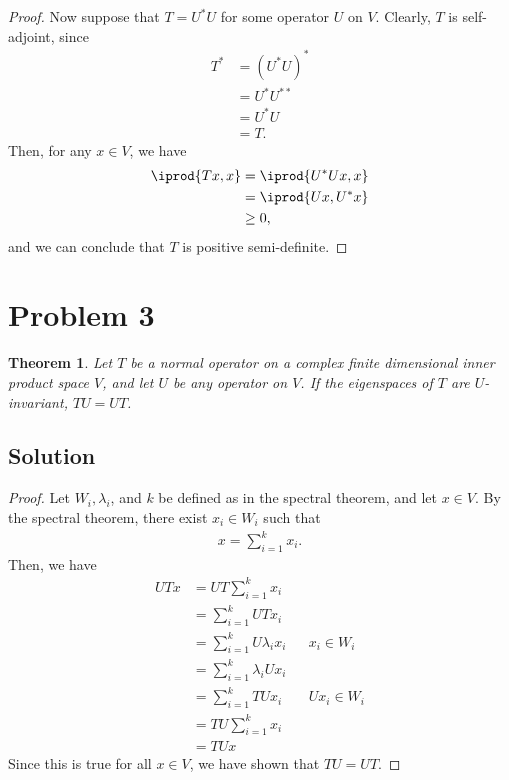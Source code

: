 \documentclass[10pt,a4paper]{article}
\newtheorem{theorem}{Theorem}
\theoremstyle{definition}
\begin{document}
\begin{proof}
Now suppose that $T = U^* U$ for some operator $U$ on $V$. Clearly, $T$ is self-adjoint, since
\begin{align*}
T^* &= (U^* U)^*\\
&= U^* U^{**}\\
&= U^* U\\
&= T.
\end{align*} 
Then, for any $x \in V$, we have
\begin{align*}
\iprod{Tx, x} &= \iprod{U^*U x, x}\\
&= \iprod{U x, U^* x}\\
&\geq 0,
\end{align*}
and we can conclude that $T$ is positive semi-definite.
\end{proof}

\section*{Problem 3}
\begin{theorem}
Let $T$ be a normal operator on a complex finite dimensional inner product space $V$, and let $U$ be any operator on $V$. If the
eigenspaces of $T$ are $U$-invariant, $TU = UT$.
\end{theorem}

\subsection*{Solution}
\begin{proof}
Let $W_i, \lambda_i$, and $k$ be defined as in the spectral theorem, and let $x \in V$. By the spectral theorem, there exist $x_i \in W_i$ such that
\begin{align*}
x = \sum_{i=1}^k x_i.
\end{align*}
Then, we have 
\begin{align*}
UTx &= UT \sum_{i=1}^k x_i\\
&= \sum_{i=1}^k UTx_i\\
&= \sum_{i=1}^k U \lambda_i x_i &&x_i \in W_i\\
&= \sum_{i=1}^k \lambda_i U x_i\\
&= \sum_{i=1}^k TUx_i && Ux_i \in W_i\\
&= TU \sum_{i=1}^k x_i\\
&= TUx
\end{align*}
Since this is true for all $x \in V$, we have shown that $TU = UT$.
\end{proof}
\end{document}
